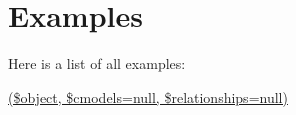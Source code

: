 \section{Examples}
Here is a list of all examples\+:\begin{DoxyCompactItemize}
\item 
\hyperlink{_2_users_2n_2_desktop_2_islandora_modules_2islandora_bioinformatics_base_2islandora_bioinformatics_base_8module-example}{(\$object, \$cmodels=null, \$relationships=null)}
\end{DoxyCompactItemize}
